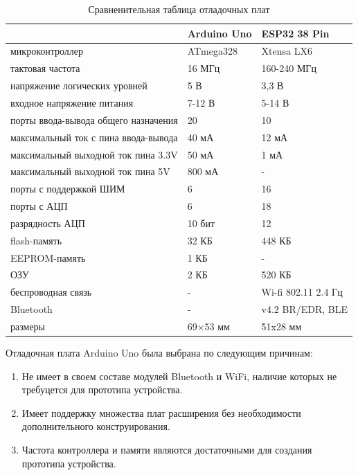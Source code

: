 \begin{table}[H]
    \centering
    \caption{Сравненительная таблица отладочных плат}
    \begin{tabular}{|l|l|l|}
        \hline
         & Arduino Uno & ESP32 38 Pin \\
        \hline
        микроконтроллер & ATmega328 & Xtensa LX6 \\
        \hline
        тактовая частота & 16 МГц & 160-240 МГц \\
        \hline
        напряжение логических уровней & 5 В & 3,3 В \\
        \hline
        входное напряжение питания & 7-12 В & 5-14 В \\
        \hline
        порты ввода-вывода общего назначения & 20 & 10 \\
        \hline
        максимальный ток с пина ввода-вывода & 40 мА & 12 мА \\
        \hline
        максимальный выходной ток пина 3.3V & 50 мА & 1 мА \\
        \hline
        максимальный выходной ток пина 5V & 800 мА & - \\
        \hline
        порты с поддержкой ШИМ & 6 & 16 \\
        \hline
        порты с АЦП & 6 & 18 \\
        \hline
        разрядность АЦП & 10 бит & 12 \\
        \hline
        flash-память & 32 КБ & 448 КБ \\
        \hline
        EEPROM-память & 1 КБ & - \\
        \hline
        ОЗУ & 2 КБ & 520 КБ \\
        \hline
        беспроводная связь & - & Wi-fi 802.11 2.4 Гц \\
        \hline
        Bluetooth & - & v4.2 BR/EDR, BLE \\
        \hline
        размеры & 69×53 мм & 51x28 мм \\
        \hline
    \end{tabular}
    \label{tab:my_label}
\end{table}

Отладочная плата Arduino Uno была выбрана по следующим причинам:

\begin{enumerate}
    \item Не имеет в своем составе модулей Bluetooth и WiFi, наличие которых не требуцется для прототипа устройства.
    \item Имеет поддержку множества плат расширения без необходимости дополнительного конструирования.
    \item Частота контроллера и памяти являются достаточными для создания прототипа устройства.
\end{enumerate}

